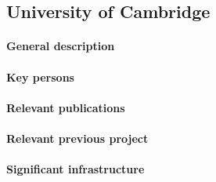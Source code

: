 \subsection{University of Cambridge}
\label{sec:ucam}

\paragraph{General description}

\paragraph{Key persons}

\paragraph{Relevant publications}

\paragraph{Relevant previous project}

\paragraph{Significant infrastructure}